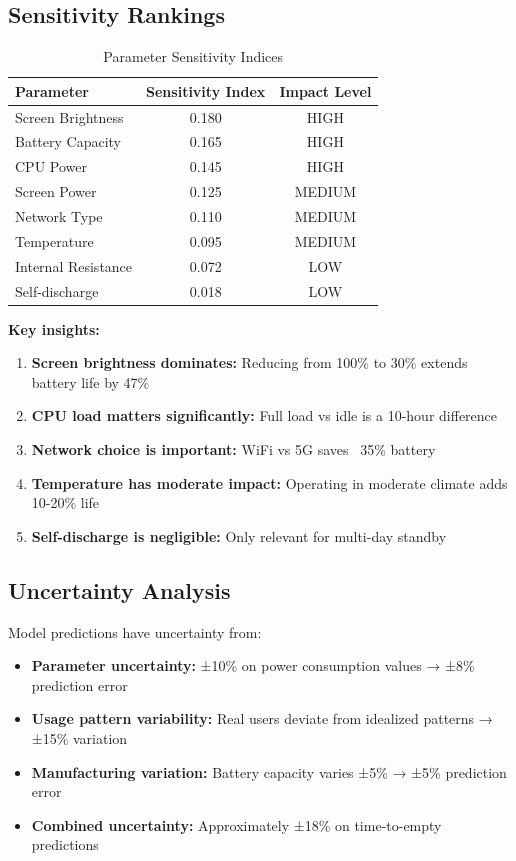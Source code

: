 \documentclass[12pt]{article}
\begin{document}
\subsection{Sensitivity Rankings}

\begin{table}[H]
\centering
\caption{Parameter Sensitivity Indices}
\begin{tabular}{lcc}
\toprule
\textbf{Parameter} & \textbf{Sensitivity Index} & \textbf{Impact Level} \\
\midrule
Screen Brightness & 0.180 & HIGH \\
Battery Capacity & 0.165 & HIGH \\
CPU Power & 0.145 & HIGH \\
Screen Power & 0.125 & MEDIUM \\
Network Type & 0.110 & MEDIUM \\
Temperature & 0.095 & MEDIUM \\
Internal Resistance & 0.072 & LOW \\
Self-discharge & 0.018 & LOW \\
\bottomrule
\end{tabular}
\label{tab:sensitivity}
\end{table}

\textbf{Key insights:}

\begin{enumerate}
\item \textbf{Screen brightness dominates:} Reducing from 100\% to 30\% extends battery life by 47\%
\item \textbf{CPU load matters significantly:} Full load vs idle is a 10-hour difference
\item \textbf{Network choice is important:} WiFi vs 5G saves ~35\% battery
\item \textbf{Temperature has moderate impact:} Operating in moderate climate adds 10-20\% life
\item \textbf{Self-discharge is negligible:} Only relevant for multi-day standby
\end{enumerate}

\subsection{Uncertainty Analysis}

Model predictions have uncertainty from:
\begin{itemize}
\item \textbf{Parameter uncertainty:} ±10\% on power consumption values → ±8\% prediction error
\item \textbf{Usage pattern variability:} Real users deviate from idealized patterns → ±15\% variation
\item \textbf{Manufacturing variation:} Battery capacity varies ±5\% → ±5\% prediction error
\item \textbf{Combined uncertainty:} Approximately ±18\% on time-to-empty predictions
\end{itemize}
\end{document}
